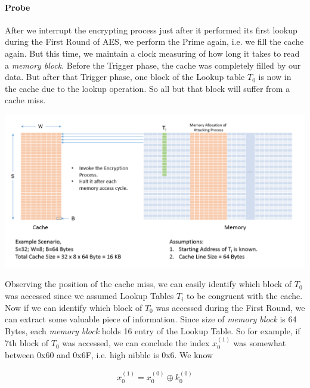 \documentclass[3p]{elsarticle}
\begin{document}
\paragraph{Probe}
After we interrupt the encrypting process just after it performed its first lookup during the First Round of AES, we perform the Prime again, i.e. we fill the cache again. But this time, we maintain a clock measuring of how long it takes to read a \emph{memory block}. Before the Trigger phase, the cache was completely filled by our data. But after that Trigger phase, one block of the 
Lookup table $T_0$ is now in the cache due to the lookup operation. So all but that block will suffer from a cache miss.

\begin{center}
\includegraphics[scale=0.4,natwidth=1159,natheight=589]{Figures/prime(new).png}
\label{fig: Demonstration of the Prime phase.}
\end{center}

Observing the position of the cache miss, we can easily identify which block of $T_0$ was accessed since we assumed Lookup Tables $T_i$ to be congruent with the cache. Now if we can identify which block of $T_0$ was accessed during the First Round, we can extract some valuable piece of information. Since size of \emph{memory block} is 64 Bytes, each \emph{memory block} holds 16 entry of the Lookup Table. So for example, if 7th block of $T_0$ was accessed, we can conclude the index $x_0^{(1)}$ was somewhat between 0x60 and 0x6F, i.e. high nibble is 0x6. We know

\begin{align*}
x_0^{(1)}=x_0^{(0)} \oplus k_0^{(0)}
\end{align*}
\end{document}
